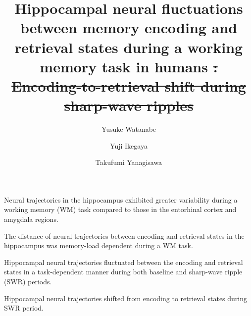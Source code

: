 \documentclass[final,3p,times,twocolumn]{elsarticle}
\providecommand{\DIFdeltex}[1]{{\protect\color{red}\sout{#1}}}                      %
\providecommand{\DIFdelbegin}{} %
\providecommand{\DIFdelend}{} %
\providecommand{\DIFdel}[1]{\texorpdfstring{\DIFdeltex{#1}}{}} %
\newcommand{\DIFscaledelfig}{0.5}
\newlength{\DIFdelgraphicswidth} %
\newlength{\DIFdelgraphicsheight} %
\newcommand{\DIFdelincludegraphics}[2][]{%
\sbox{\DIFdelgraphicsbox}{\DIFOincludegraphics[#1]{#2}}%
\settoboxwidth{\DIFdelgraphicswidth}{\DIFdelgraphicsbox} %
\settoboxtotalheight{\DIFdelgraphicsheight}{\DIFdelgraphicsbox} %
\scalebox{\DIFscaledelfig}{%
\parbox[b]{\DIFdelgraphicswidth}{\usebox{\DIFdelgraphicsbox}\\[-\baselineskip] \rule{\DIFdelgraphicswidth}{0em}}\llap{\resizebox{\DIFdelgraphicswidth}{\DIFdelgraphicsheight}{%
\setlength{\unitlength}{\DIFdelgraphicswidth}%
\begin{picture}(1,1)%
\thicklines\linethickness{2pt} %
{\color[rgb]{1,0,0}\put(0,0){\framebox(1,1){}}}%
{\color[rgb]{1,0,0}\put(0,0){\line( 1,1){1}}}%
{\color[rgb]{1,0,0}\put(0,1){\line(1,-1){1}}}%
\end{picture}%
}\hspace*{3pt}}} %
} %
\DeclareRobustCommand{\DIFdelbegin}{\DIFOdelbegin \let\includegraphics\DIFdelincludegraphics} %
\DeclareRobustCommand{\DIFdelend}{\DIFOaddend \let\includegraphics\DIFOincludegraphics} %
\begin{document}
\begin{frontmatter}
\begin{highlights}

\item Neural trajectories in the hippocampus exhibited greater variability during a working memory (WM) task compared to those in the entorhinal cortex and amygdala regions.

\item The distance of neural trajectories between encoding and retrieval states in the hippocampus was memory-load dependent during a WM task.


\item Hippocampal neural trajectories fluctuated between the encoding and retrieval states in a task-dependent manner during both baseline and sharp-wave ripple (SWR) periods.

\item Hippocampal neural trajectories shifted from encoding to retrieval states during SWR period.

\end{highlights}\title{
Hippocampal neural fluctuations between memory encoding and retrieval states during a working memory task in humans
\DIFdelbegin \DIFdel{: Encoding-to-retrieval shift during sharp-wave ripples
}\DIFdelend }\author[1]{Yusuke Watanabe}
\author[2,3,4]{Yuji Ikegaya}
\author[1,5]{Takufumi Yanagisawa}

\address[1]{Institute for Advanced Cocreation studies, Osaka University, 2-2 Yamadaoka, Suita, 565-0871, Osaka, Japan}
\address[2]{Graduate School of Pharmaceutical Sciences, The University of Tokyo, 7-3-1 Hongo, Tokyo, 113-0033, Japan}
\address[3]{Institute for AI and Beyond, The University of Tokyo, 7-3-1 Hongo, Tokyo, 113-0033, Japan}
\address[4]{Center for Information and Neural Networks, National Institute of Information and Communications Technology, 1-4 Yamadaoka, Suita City, 565-0871, Osaka, Japan}
\address[5]{Department of Neurosurgery, Osaka University Graduate School of Medicine, 2-2 Yamadaoka, Osaka, 565-0871, Japan}


\end{frontmatter}
\end{document}
